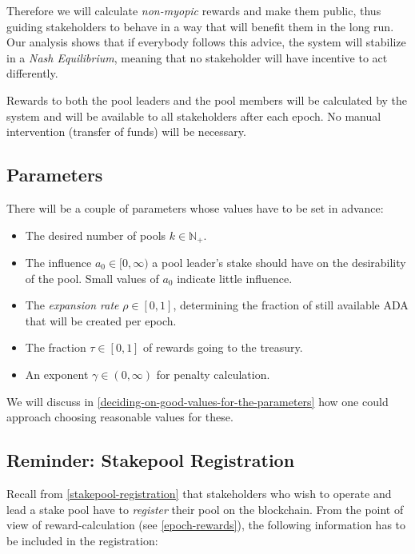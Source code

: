\documentclass[11pt,a4paper]{article}
\begin{document}
Therefore we will calculate \emph{non-myopic} rewards and make them
public, thus guiding stakeholders to behave in a way that will benefit
them in the long run. Our analysis shows that if everybody follows this
advice, the system will stabilize in a \emph{Nash Equilibrium}, meaning
that no stakeholder will have incentive to act differently.

Rewards to both the pool leaders and the pool members will be calculated
by the system and will be available to all stakeholders after each
epoch. No manual intervention (transfer of funds) will be necessary.

\subsection{Parameters}
\label{parameters}

There will be a couple of parameters whose values have to be set in
advance:

\begin{itemize}
\item
  The desired number of pools \(k\in\mathbb{N}_+\).
\item
  The influence \(a_0\in[0,\infty)\) a pool leader's stake should have
  on the desirability of the pool. Small values of \(a_0\) indicate
  little influence.
\item
  The \emph{expansion rate} \(\rho\in[0,1]\), determining the fraction
  of still available ADA that will be created per epoch.
\item
  The fraction \(\tau\in[0,1]\) of rewards going to the treasury.
\item
  An exponent \(\gamma\in(0,\infty)\) for penalty calculation.
\end{itemize}

We will discuss
in \cref{deciding-on-good-values-for-the-parameters} how one
could approach choosing reasonable values for these.

\subsection{Reminder: Stakepool Registration}
\label{reminder-stakepool-registration}

Recall from \cref{stakepool-registration} that stakeholders
who wish to operate and lead a stake pool have to \emph{register} their
pool on the blockchain. From the point of view of reward-calculation
(see \cref{epoch-rewards}), the following information has to
be included in the registration:
\end{document}
